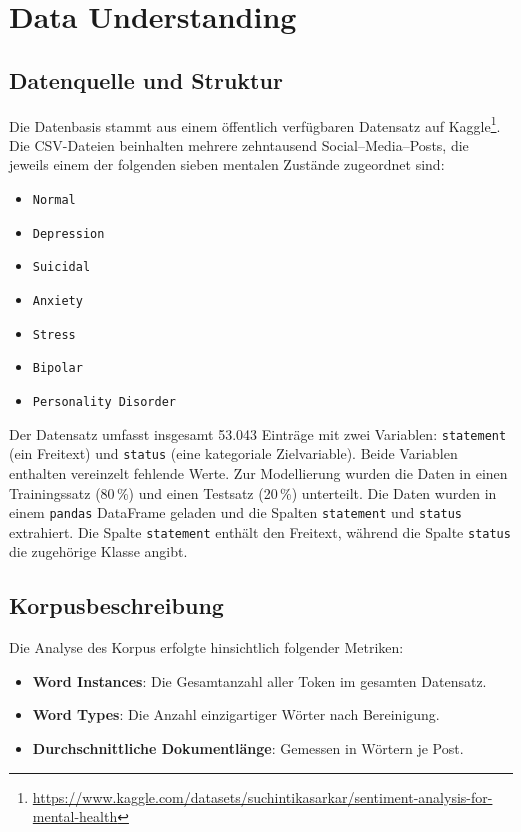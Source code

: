\section{Data Understanding}

\subsection{Datenquelle und Struktur}
Die Datenbasis stammt aus einem öffentlich verfügbaren Datensatz auf Kaggle\footnote{\url{https://www.kaggle.com/datasets/suchintikasarkar/sentiment-analysis-for-mental-health}}. Die CSV-Dateien beinhalten mehrere zehntausend Social–Media–Posts, die jeweils einem der folgenden sieben mentalen Zustände zugeordnet sind:

\begin{itemize}
    \item \texttt{Normal}
    \item \texttt{Depression}
    \item \texttt{Suicidal}
    \item \texttt{Anxiety}
    \item \texttt{Stress}
    \item \texttt{Bipolar}
    \item \texttt{Personality Disorder}
\end{itemize}

Der Datensatz umfasst insgesamt 53.043 Einträge mit zwei Variablen: \texttt{statement} (ein Freitext) und \texttt{status} (eine kategoriale Zielvariable). Beide Variablen enthalten vereinzelt fehlende Werte. Zur Modellierung wurden die Daten in einen Trainingssatz (80\,\%) und einen Testsatz (20\,\%) unterteilt.
Die Daten wurden in einem \texttt{pandas} DataFrame geladen und die Spalten \texttt{statement} und \texttt{status} extrahiert. Die Spalte \texttt{statement} enthält den Freitext, während die Spalte \texttt{status} die zugehörige Klasse angibt.

\newpage

\subsection{Korpusbeschreibung}
Die Analyse des Korpus erfolgte hinsichtlich folgender Metriken:
\begin{itemize}
    \item \textbf{Word Instances}: Die Gesamtanzahl aller Token im gesamten Datensatz.
    \item \textbf{Word Types}: Die Anzahl einzigartiger Wörter nach Bereinigung.
    \item \textbf{Durchschnittliche Dokumentlänge}: Gemessen in Wörtern je Post.
\end{itemize}

